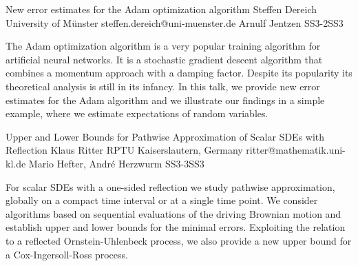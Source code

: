 \begin{talk}
  {New error estimates for the Adam optimization algorithm}%
  {Steffen Dereich}%
  {University of M\"unster}%
  {steffen.dereich@uni-muenster.de}%
  {Arnulf Jentzen}%
{}{}{SS3-2}{SS3}

			

The Adam optimization algorithm is a very popular training algorithm for artificial neural networks. It is a stochastic gradient descent algorithm that combines a momentum approach with a damping factor. Despite its popularity its theoretical analysis is still in its infancy. In this talk, we provide new error estimates for the Adam algorithm and we illustrate our findings in a simple example, where we estimate expectations of random variables.

\end{talk}

\begin{talk}
  {Upper and Lower Bounds for Pathwise Approximation of Scalar SDEs with Reflection}%
  {Klaus Ritter}%
  {RPTU Kaiserslautern, Germany}%
  {ritter@mathematik.uni-kl.de}%
  {Mario Hefter, Andr\'e Herzwurm}%
{}{}{SS3-3}{SS3}


				
For scalar SDEs with a one-sided reflection we study 
pathwise approximation, globally on a compact time interval 
or at a single time point. We consider algorithms
based on sequential evaluations of the 
driving Brownian motion and establish
upper and lower bounds for the minimal
errors. Exploiting the relation to a reflected
Ornstein-Uhlenbeck process, we also provide
a new upper bound for a Cox-Ingersoll-Ross process.
\end{talk}

